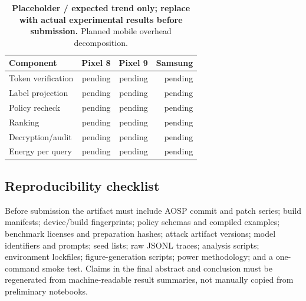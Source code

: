 \begin{table}[t]
\centering
\caption{\textbf{Placeholder / expected trend only; replace with actual experimental results before submission.} Planned mobile overhead decomposition.}
\label{tab:pending-overhead}
\small
\begin{tabular}{lrrr}
\toprule
Component & Pixel 8 & Pixel 9 & Samsung \\
\midrule
Token verification & pending & pending & pending \\
Label projection & pending & pending & pending \\
Policy recheck & pending & pending & pending \\
Ranking & pending & pending & pending \\
Decryption/audit & pending & pending & pending \\
Energy per query & pending & pending & pending \\
\bottomrule
\end{tabular}
\end{table}



\subsection{Reproducibility checklist}

Before submission the artifact must include AOSP commit and patch series; build manifests; device/build fingerprints; policy schemas and compiled examples; benchmark licenses and preparation hashes; attack artifact versions; model identifiers and prompts; seed lists; raw JSONL traces; analysis scripts; environment lockfiles; figure-generation scripts; power methodology; and a one-command smoke test. Claims in the final abstract and conclusion must be regenerated from machine-readable result summaries, not manually copied from preliminary notebooks.

